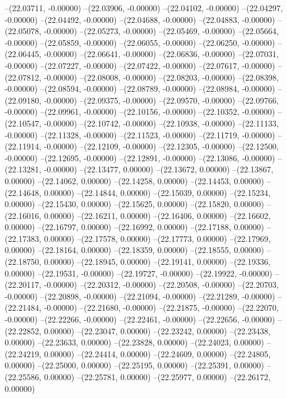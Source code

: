 --(22.03711, -0.00000)
--(22.03906, -0.00000)
--(22.04102, -0.00000)
--(22.04297, -0.00000)
--(22.04492, -0.00000)
--(22.04688, -0.00000)
--(22.04883, -0.00000)
--(22.05078, -0.00000)
--(22.05273, -0.00000)
--(22.05469, -0.00000)
--(22.05664, -0.00000)
--(22.05859, -0.00000)
--(22.06055, -0.00000)
--(22.06250, -0.00000)
--(22.06445, -0.00000)
--(22.06641, -0.00000)
--(22.06836, -0.00000)
--(22.07031, -0.00000)
--(22.07227, -0.00000)
--(22.07422, -0.00000)
--(22.07617, -0.00000)
--(22.07812, -0.00000)
--(22.08008, -0.00000)
--(22.08203, -0.00000)
--(22.08398, -0.00000)
--(22.08594, -0.00000)
--(22.08789, -0.00000)
--(22.08984, -0.00000)
--(22.09180, -0.00000)
--(22.09375, -0.00000)
--(22.09570, -0.00000)
--(22.09766, -0.00000)
--(22.09961, -0.00000)
--(22.10156, -0.00000)
--(22.10352, -0.00000)
--(22.10547, -0.00000)
--(22.10742, -0.00000)
--(22.10938, -0.00000)
--(22.11133, -0.00000)
--(22.11328, -0.00000)
--(22.11523, -0.00000)
--(22.11719, -0.00000)
--(22.11914, -0.00000)
--(22.12109, -0.00000)
--(22.12305, -0.00000)
--(22.12500, -0.00000)
--(22.12695, -0.00000)
--(22.12891, -0.00000)
--(22.13086, -0.00000)
--(22.13281, -0.00000)
--(22.13477, 0.00000)
--(22.13672, 0.00000)
--(22.13867, 0.00000)
--(22.14062, 0.00000)
--(22.14258, 0.00000)
--(22.14453, 0.00000)
--(22.14648, 0.00000)
--(22.14844, 0.00000)
--(22.15039, 0.00000)
--(22.15234, 0.00000)
--(22.15430, 0.00000)
--(22.15625, 0.00000)
--(22.15820, 0.00000)
--(22.16016, 0.00000)
--(22.16211, 0.00000)
--(22.16406, 0.00000)
--(22.16602, 0.00000)
--(22.16797, 0.00000)
--(22.16992, 0.00000)
--(22.17188, 0.00000)
--(22.17383, 0.00000)
--(22.17578, 0.00000)
--(22.17773, 0.00000)
--(22.17969, 0.00000)
--(22.18164, 0.00000)
--(22.18359, 0.00000)
--(22.18555, 0.00000)
--(22.18750, 0.00000)
--(22.18945, 0.00000)
--(22.19141, 0.00000)
--(22.19336, 0.00000)
--(22.19531, -0.00000)
--(22.19727, -0.00000)
--(22.19922, -0.00000)
--(22.20117, -0.00000)
--(22.20312, -0.00000)
--(22.20508, -0.00000)
--(22.20703, -0.00000)
--(22.20898, -0.00000)
--(22.21094, -0.00000)
--(22.21289, -0.00000)
--(22.21484, -0.00000)
--(22.21680, -0.00000)
--(22.21875, -0.00000)
--(22.22070, -0.00000)
--(22.22266, -0.00000)
--(22.22461, -0.00000)
--(22.22656, -0.00000)
--(22.22852, 0.00000)
--(22.23047, 0.00000)
--(22.23242, 0.00000)
--(22.23438, 0.00000)
--(22.23633, 0.00000)
--(22.23828, 0.00000)
--(22.24023, 0.00000)
--(22.24219, 0.00000)
--(22.24414, 0.00000)
--(22.24609, 0.00000)
--(22.24805, 0.00000)
--(22.25000, 0.00000)
--(22.25195, 0.00000)
--(22.25391, 0.00000)
--(22.25586, 0.00000)
--(22.25781, 0.00000)
--(22.25977, 0.00000)
--(22.26172, 0.00000)
